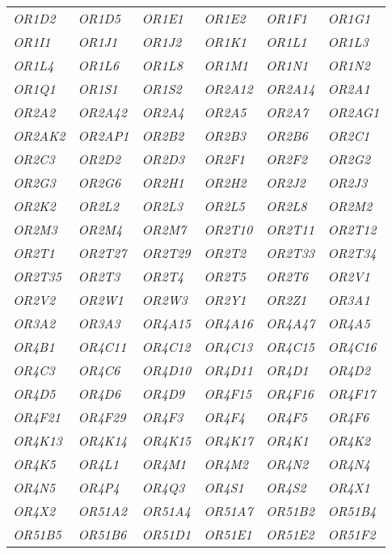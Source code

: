 {\begin{longtable}{>{\em}l>{\em}l>{\em}l>{\em}l>{\em}l>{\em}l}
  \rowcolor{black!10} 
  OR1D2 & OR1D5 & OR1E1 & OR1E2 & OR1F1 & OR1G1 \\ 
  \rowcolor{black!5} 
  OR1I1 & OR1J1 & OR1J2 & OR1K1 & OR1L1 & OR1L3 \\ 
  \rowcolor{black!10} 
  OR1L4 & OR1L6 & OR1L8 & OR1M1 & OR1N1 & OR1N2 \\ 
  \rowcolor{black!5} 
  OR1Q1 & OR1S1 & OR1S2 & OR2A12 & OR2A14 & OR2A1 \\ 
  \rowcolor{black!10} 
  OR2A2 & OR2A42 & OR2A4 & OR2A5 & OR2A7 & OR2AG1 \\ 
  \rowcolor{black!5} 
  OR2AK2 & OR2AP1 & OR2B2 & OR2B3 & OR2B6 & OR2C1 \\ 
  \rowcolor{black!10} 
  OR2C3 & OR2D2 & OR2D3 & OR2F1 & OR2F2 & OR2G2 \\ 
  \rowcolor{black!5} 
  OR2G3 & OR2G6 & OR2H1 & OR2H2 & OR2J2 & OR2J3 \\ 
  \rowcolor{black!10} 
  OR2K2 & OR2L2 & OR2L3 & OR2L5 & OR2L8 & OR2M2 \\ 
  \rowcolor{black!5} 
  OR2M3 & OR2M4 & OR2M7 & OR2T10 & OR2T11 & OR2T12 \\ 
  \rowcolor{black!10} 
  OR2T1 & OR2T27 & OR2T29 & OR2T2 & OR2T33 & OR2T34 \\ 
  \rowcolor{black!5} 
  OR2T35 & OR2T3 & OR2T4 & OR2T5 & OR2T6 & OR2V1 \\ 
  \rowcolor{black!10} 
  OR2V2 & OR2W1 & OR2W3 & OR2Y1 & OR2Z1 & OR3A1 \\ 
  \rowcolor{black!5} 
  OR3A2 & OR3A3 & OR4A15 & OR4A16 & OR4A47 & OR4A5 \\ 
  \rowcolor{black!10} 
  OR4B1 & OR4C11 & OR4C12 & OR4C13 & OR4C15 & OR4C16 \\ 
  \rowcolor{black!5} 
  OR4C3 & OR4C6 & OR4D10 & OR4D11 & OR4D1 & OR4D2 \\ 
  \rowcolor{black!10} 
  OR4D5 & OR4D6 & OR4D9 & OR4F15 & OR4F16 & OR4F17 \\ 
  \rowcolor{black!5} 
  OR4F21 & OR4F29 & OR4F3 & OR4F4 & OR4F5 & OR4F6 \\ 
  \rowcolor{black!10} 
  OR4K13 & OR4K14 & OR4K15 & OR4K17 & OR4K1 & OR4K2 \\ 
  \rowcolor{black!5} 
  OR4K5 & OR4L1 & OR4M1 & OR4M2 & OR4N2 & OR4N4 \\ 
  \rowcolor{black!10} 
  OR4N5 & OR4P4 & OR4Q3 & OR4S1 & OR4S2 & OR4X1 \\ 
  \rowcolor{black!5} 
  OR4X2 & OR51A2 & OR51A4 & OR51A7 & OR51B2 & OR51B4 \\ 
  \rowcolor{black!10} 
  OR51B5 & OR51B6 & OR51D1 & OR51E1 & OR51E2 & OR51F2 \\ 

\end{longtable}}
